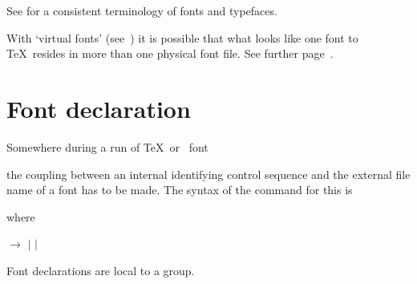 \documentclass{book}
\begin{document}
See \cite{S} for a consistent terminology of fonts and typefaces.

With `virtual fonts' (see~\cite{K:virt}) it is possible that
what looks like one font to \TeX\ resides in more than
one physical font file.
\alt
See further page~\pageref{virtual:fonts}.

\section{Font declaration}

Somewhere during a run of \TeX\ or \IniTeX\
\cstoidx font\par
the coupling between an internal identifying control sequence
and the external file name of a font has to be made.
The syntax of the command for this is
\begin{disp}%
\end{disp}
where
\begin{disp} $\longrightarrow$  
$|$   $|$ \end{disp}
Font declarations are local to a group.
\end{document}
